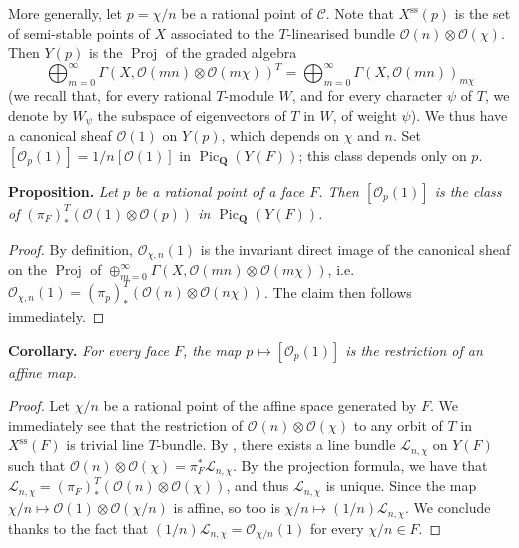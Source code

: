 \documentclass{article}
\newenvironment{itenv}[1]
  {\phantomsection\par\medskip\noindent\textbf{#1.}\itshape}
  {\medskip}
\newcommand{\scr}[1]{{\mathscr{#1}}}
\newcommand{\QQ}{\mathbf{Q}}
\renewcommand{\ss}{\mathrm{ss}}
\DeclareMathOperator{\Pic}{Pic}
\DeclareMathOperator{\Proj}{Proj}
\newcommand{\oldpage}[1]{\marginpar{\footnotesize$\Big\vert$ \textit{p.~#1}}}
\begin{document}
More generally, let $p=\chi/n$ be a rational point of $\mathcal{C}$.
Note that $X^\ss(p)$ is the set of semi-stable points of $X$ associated to the
\oldpage{514}
$T$-linearised bundle $\scr{O}(n)\otimes\scr{O}(\chi)$.
Then $Y(p)$ is the $\Proj$ of the graded algebra
\[
  \bigoplus_{m=0}^\infty \Gamma(X,\scr{O}(mn)\otimes\scr{O}(m\chi))^T = \bigoplus_{m=0}^\infty \Gamma(X,\scr{O}(mn))_{m\chi}
\]
(we recall that, for every rational $T$-module $W$, and for every character $\psi$ of $T$, we denote by $W_\psi$ the subspace of eigenvectors of $T$ in $W$, of weight $\psi$).
We thus have a canonical sheaf $\scr{O}(1)$ on $Y(p)$, which depends on $\chi$ and $n$.
Set $[\scr{O}_p(1)] = 1/n[\scr{O}(1)]$ in $\Pic_\QQ(Y(F))$;
this class depends only on $p$.

\begin{itenv}{Proposition}
  Let $p$ be a rational point of a face $F$.
  Then $[\scr{O}_p(1)]$ is the class of $(\pi_F)_*^T(\scr{O}(1)\otimes\scr{O}(p))$ in $\Pic_\QQ(Y(F))$.
\end{itenv}

\begin{proof}
  By definition, $\scr{O}_{\chi,n}(1)$ is the invariant direct image of the canonical sheaf on the $\Proj$ of $\oplus_{m=0}^\infty\Gamma(X,\scr{O}(mn)\otimes\scr{O}(m\chi))$, i.e. $\scr{O}_{\chi,n}(1) = (\pi_p)_*^T(\scr{O}(n)\otimes\scr{O}(n\chi))$.
  The claim then follows immediately.
\end{proof}

\begin{itenv}{Corollary}
  For every face $F$, the map $p\mapsto[\scr{O}_p(1)]$ is the restriction of an affine map.
\end{itenv}

\begin{proof}
  Let $\chi/n$ be a rational point of the affine space generated by $F$.
  We immediately see that the restriction of $\scr{O}(n)\otimes\scr{O}(\chi)$ to any orbit of $T$ in $X^\ss(F)$ is trivial line $T$-bundle.
  By \cite[Proposition~3]{Kra2}, there exists a line bundle $\scr{L}_{n,\chi}$ on $Y(F)$ such that $\scr{O}(n)\otimes\scr{O}(\chi)=\pi_F^*\scr{L}_{n,\chi}$.
  By the projection formula, we have that $\scr{L}_{n,\chi}=(\pi_F)_*^T(\scr{O}(n)\otimes\scr{O}(\chi))$, and thus $\scr{L}_{n,\chi}$ is unique.
  Since the map $\chi/n\mapsto\scr{O}(1)\otimes\scr{O}(\chi/n)$ is affine, so too is $\chi/n\mapsto(1/n)\scr{L}_{n,\chi}$.
  We conclude thanks to the fact that $(1/n)\scr{L}_{n,\chi}=\scr{O}_{\chi/n}(1)$ for every $\chi/n\in F$.
\end{proof}
\end{document}

